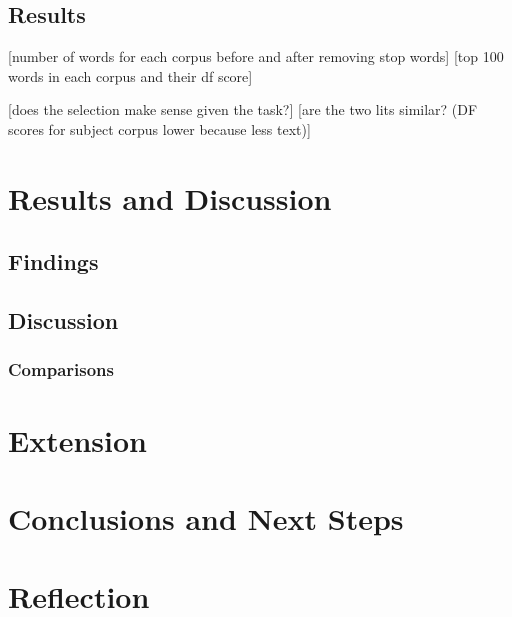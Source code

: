 \documentclass[12pt]{article}
\begin{document}
\subsection{Results}
[number of words for each corpus before and after removing stop words]
[top 100 words in each corpus and their df score]

[does the selection make sense given the task?]
[are the two lits similar? (DF scores for subject corpus lower because less text)]

\section{Results and Discussion}
\subsection{Findings}
\subsection{Discussion}
\subsubsection{Comparisons}

\section{Extension}

\section{Conclusions and Next Steps}

\section{Reflection}



\end{document}
